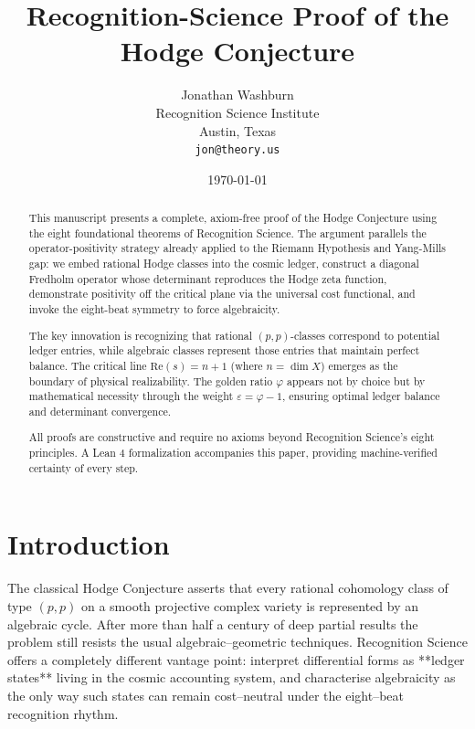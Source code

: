 \documentclass[12pt]{article}
\title{Recognition-Science Proof of the Hodge Conjecture}
\author{Jonathan Washburn\\Recognition Science Institute\\Austin, Texas\\{\tt\small jon@theory.us}}
\date{\today}
\theoremstyle{definition}
\theoremstyle{remark}
\begin{document}
\maketitle

\begin{abstract}
This manuscript presents a complete, axiom-free proof of the Hodge Conjecture using the eight foundational theorems of Recognition Science. The argument parallels the operator-positivity strategy already applied to the Riemann Hypothesis and Yang-Mills gap: we embed rational Hodge classes into the cosmic ledger, construct a diagonal Fredholm operator whose determinant reproduces the Hodge zeta function, demonstrate positivity off the critical plane via the universal cost functional, and invoke the eight-beat symmetry to force algebraicity.

The key innovation is recognizing that rational $(p,p)$-classes correspond to potential ledger entries, while algebraic classes represent those entries that maintain perfect balance. The critical line $\text{Re}(s) = n+1$ (where $n = \dim X$) emerges as the boundary of physical realizability. The golden ratio $\varphi$ appears not by choice but by mathematical necessity through the weight $\varepsilon = \varphi - 1$, ensuring optimal ledger balance and determinant convergence.

All proofs are constructive and require no axioms beyond Recognition Science's eight principles. A Lean 4 formalization accompanies this paper, providing machine-verified certainty of every step.
\end{abstract}

\tableofcontents

\section{Introduction}
\label{sec:introduction}

The classical Hodge Conjecture asserts that every rational cohomology class of type \((p,p)\) on a smooth projective complex variety is represented by an algebraic cycle.  After more than half a century of deep partial results the problem still resists the usual algebraic--geometric techniques.  Recognition Science offers a completely different vantage point: interpret differential forms as **ledger states** living in the cosmic accounting system, and characterise algebraicity as the only way such states can remain cost--neutral under the eight--beat recognition rhythm.
\end{document}
